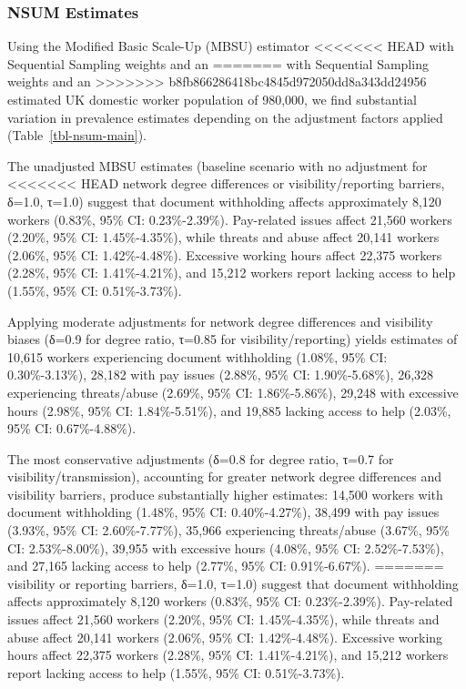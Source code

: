\documentclass[
  12pt,
  letterpaper,
  DIV=11,
  numbers=noendperiod]{scrartcl}
\theoremstyle{plain}
\theoremstyle{definition}
\begin{document}
\subsubsection{NSUM Estimates}\label{nsum-estimates}

Using the Modified Basic Scale-Up (MBSU) estimator
<<<<<<< HEAD
\textcite{feeh16-generalizing} with Sequential Sampling weights and an
=======
\textcite{fee16-generalizing} with Sequential Sampling weights and an
>>>>>>> b8fb866286418bc4845d972050dd8a343dd24956
estimated UK domestic worker population of 980,000, we find substantial
variation in prevalence estimates depending on the adjustment factors
applied (Table~\ref{tbl-nsum-main}).

The unadjusted MBSU estimates (baseline scenario with no adjustment for
<<<<<<< HEAD
network degree differences or visibility/reporting barriers, δ=1.0,
τ=1.0) suggest that document withholding affects approximately 8,120
workers (0.83\%, 95\% CI: 0.23\%-2.39\%). Pay-related issues affect
21,560 workers (2.20\%, 95\% CI: 1.45\%-4.35\%), while threats and abuse
affect 20,141 workers (2.06\%, 95\% CI: 1.42\%-4.48\%). Excessive
working hours affect 22,375 workers (2.28\%, 95\% CI: 1.41\%-4.21\%),
and 15,212 workers report lacking access to help (1.55\%, 95\% CI:
0.51\%-3.73\%).

Applying moderate adjustments for network degree differences and
visibility biases (δ=0.9 for degree ratio, τ=0.85 for
visibility/reporting) yields estimates of 10,615 workers experiencing
document withholding (1.08\%, 95\% CI: 0.30\%-3.13\%), 28,182 with pay
issues (2.88\%, 95\% CI: 1.90\%-5.68\%), 26,328 experiencing
threats/abuse (2.69\%, 95\% CI: 1.86\%-5.86\%), 29,248 with excessive
hours (2.98\%, 95\% CI: 1.84\%-5.51\%), and 19,885 lacking access to
help (2.03\%, 95\% CI: 0.67\%-4.88\%).

The most conservative adjustments (δ=0.8 for degree ratio, τ=0.7 for
visibility/transmission), accounting for greater network degree
differences and visibility barriers, produce substantially higher
estimates: 14,500 workers with document withholding (1.48\%, 95\% CI:
0.40\%-4.27\%), 38,499 with pay issues (3.93\%, 95\% CI: 2.60\%-7.77\%),
35,966 experiencing threats/abuse (3.67\%, 95\% CI: 2.53\%-8.00\%),
39,955 with excessive hours (4.08\%, 95\% CI: 2.52\%-7.53\%), and 27,165
lacking access to help (2.77\%, 95\% CI: 0.91\%-6.67\%).
=======
visibility or reporting barriers, δ=1.0, τ=1.0) suggest that document
withholding affects approximately 8,120 workers (0.83\%, 95\% CI:
0.23\%-2.39\%). Pay-related issues affect 21,560 workers (2.20\%, 95\%
CI: 1.45\%-4.35\%), while threats and abuse affect 20,141 workers
(2.06\%, 95\% CI: 1.42\%-4.48\%). Excessive working hours affect 22,375
workers (2.28\%, 95\% CI: 1.41\%-4.21\%), and 15,212 workers report
lacking access to help (1.55\%, 95\% CI: 0.51\%-3.73\%).
\end{document}
